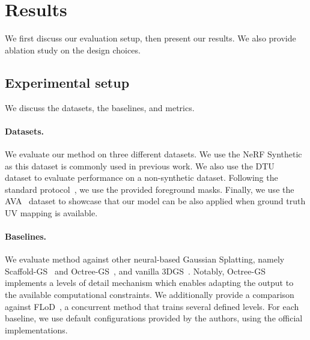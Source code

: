 


\section{Results}
  \label{sec:clog-result}

  We first discuss our evaluation setup, then present our results.
  We also provide ablation study on the design choices.

  \subsection{Experimental setup}

    We discuss the datasets, the baselines, and metrics.

    \paragraph{Datasets.}
      We evaluate our method on three different datasets.
      We use the NeRF Synthetic~\cite{mildenhall2020nerf} as this dataset is
      commonly used in previous work.
      We also use the DTU~\cite{aanaes2016large} dataset to evaluate
      performance on a non-synthetic dataset.
      Following the standard protocol~\cite{ren2024octree}, we use the
      provided foreground masks.
      Finally, we use the AVA~\cite{martinez2024codec} dataset to showcase
      that our model can be also applied when ground truth UV mapping is
      available.

    \paragraph{Baselines.}
      We evaluate method against other neural-based Gaussian Splatting, namely
      Scaffold-GS~\cite{lu2024scaffold} and Octree-GS~\cite{ren2024octree},
      and vanilla 3DGS~\cite{kerbl20233d}.
      Notably, Octree-GS implements a levels of detail mechanism which enables
      adapting the output to the available computational constraints.
      We additionally provide a comparison against FLoD~\cite{seo2024flod}, a
      concurrent method that trains several defined levels.
      For each baseline, we use default configurations provided by the
      authors, using the official implementations.

